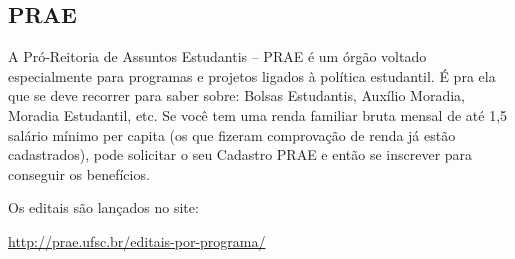 \subsection{PRAE} A Pró-Reitoria de Assuntos Estudantis – PRAE é um órgão voltado especialmente para programas e projetos ligados à política estudantil. É pra ela que se deve recorrer para saber sobre: Bolsas Estudantis, Auxílio Moradia, Moradia Estudantil, etc. Se você tem uma renda familiar bruta mensal de até 1,5 salário mínimo per capita (os que fizeram comprovação de renda já estão cadastrados), pode solicitar o seu Cadastro PRAE e então se inscrever para conseguir os benefícios. 

Os editais são lançados no site:

\url{http://prae.ufsc.br/editais-por-programa/}
